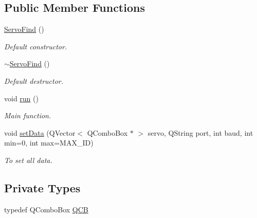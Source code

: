 \subsection*{Public Member Functions}
\begin{DoxyCompactItemize}
\item 
\hyperlink{a00008_ad9b1d82aecc71025fb606b79b9bf6ce1}{Servo\+Find} ()
\begin{DoxyCompactList}\small\item\em Default constructor. \end{DoxyCompactList}\item 
\hyperlink{a00008_a5f353598d5d40289c039412288e5bf73}{$\sim$\+Servo\+Find} ()
\begin{DoxyCompactList}\small\item\em Default destructor. \end{DoxyCompactList}\item 
void \hyperlink{a00008_a4edb0ac2852a93f84c6aa04d5953e28d}{run} ()
\begin{DoxyCompactList}\small\item\em Main function. \end{DoxyCompactList}\item 
void \hyperlink{a00008_a440f961980162cfd7c2ca9031b2a76e8}{set\+Data} (Q\+Vector$<$ Q\+Combo\+Box $\ast$ $>$ servo, Q\+String port, int baud, int min=0, int max=M\+A\+X\+\_\+\+I\+D)
\begin{DoxyCompactList}\small\item\em To set all data. \end{DoxyCompactList}\end{DoxyCompactItemize}
\subsection*{Private Types}
\begin{DoxyCompactItemize}
\item 
typedef Q\+Combo\+Box \hyperlink{a00008_a8cfdbef4d4dc51f1b200a885ff827711}{Q\+C\+B}
\end{DoxyCompactItemize}
